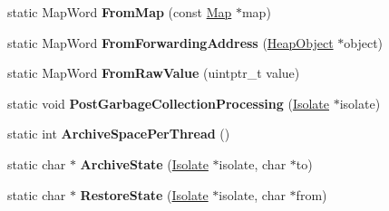 \begin{DoxyCompactItemize}
\item 
\hypertarget{classv8_1_1internal_1_1_b_a_s_e___e_m_b_e_d_d_e_d_aaaaa3610f247135644c673d03c286aaf}{}static Map\+Word {\bfseries From\+Map} (const \hyperlink{classv8_1_1internal_1_1_map}{Map} $\ast$map)\label{classv8_1_1internal_1_1_b_a_s_e___e_m_b_e_d_d_e_d_aaaaa3610f247135644c673d03c286aaf}

\item 
\hypertarget{classv8_1_1internal_1_1_b_a_s_e___e_m_b_e_d_d_e_d_a67614adf686a75f3632da1424d26cacf}{}static Map\+Word {\bfseries From\+Forwarding\+Address} (\hyperlink{classv8_1_1internal_1_1_heap_object}{Heap\+Object} $\ast$object)\label{classv8_1_1internal_1_1_b_a_s_e___e_m_b_e_d_d_e_d_a67614adf686a75f3632da1424d26cacf}

\item 
\hypertarget{classv8_1_1internal_1_1_b_a_s_e___e_m_b_e_d_d_e_d_a2ce3170aca80e659b7944e8dfb2a6e80}{}static Map\+Word {\bfseries From\+Raw\+Value} (uintptr\+\_\+t value)\label{classv8_1_1internal_1_1_b_a_s_e___e_m_b_e_d_d_e_d_a2ce3170aca80e659b7944e8dfb2a6e80}

\item 
\hypertarget{classv8_1_1internal_1_1_b_a_s_e___e_m_b_e_d_d_e_d_a53c5b6d001799400bdca74b7b78ba32d}{}static void {\bfseries Post\+Garbage\+Collection\+Processing} (\hyperlink{classv8_1_1internal_1_1_isolate}{Isolate} $\ast$isolate)\label{classv8_1_1internal_1_1_b_a_s_e___e_m_b_e_d_d_e_d_a53c5b6d001799400bdca74b7b78ba32d}

\item 
\hypertarget{classv8_1_1internal_1_1_b_a_s_e___e_m_b_e_d_d_e_d_aacef84781229ed27eba62a1fcf76feda}{}static int {\bfseries Archive\+Space\+Per\+Thread} ()\label{classv8_1_1internal_1_1_b_a_s_e___e_m_b_e_d_d_e_d_aacef84781229ed27eba62a1fcf76feda}

\item 
\hypertarget{classv8_1_1internal_1_1_b_a_s_e___e_m_b_e_d_d_e_d_a873bd1dbd203cc19b75756d7a7f7e925}{}static char $\ast$ {\bfseries Archive\+State} (\hyperlink{classv8_1_1internal_1_1_isolate}{Isolate} $\ast$isolate, char $\ast$to)\label{classv8_1_1internal_1_1_b_a_s_e___e_m_b_e_d_d_e_d_a873bd1dbd203cc19b75756d7a7f7e925}

\item 
\hypertarget{classv8_1_1internal_1_1_b_a_s_e___e_m_b_e_d_d_e_d_a3ff9496e748c02fd002ad537db3512b6}{}static char $\ast$ {\bfseries Restore\+State} (\hyperlink{classv8_1_1internal_1_1_isolate}{Isolate} $\ast$isolate, char $\ast$from)\label{classv8_1_1internal_1_1_b_a_s_e___e_m_b_e_d_d_e_d_a3ff9496e748c02fd002ad537db3512b6}


\end{DoxyCompactItemize}
